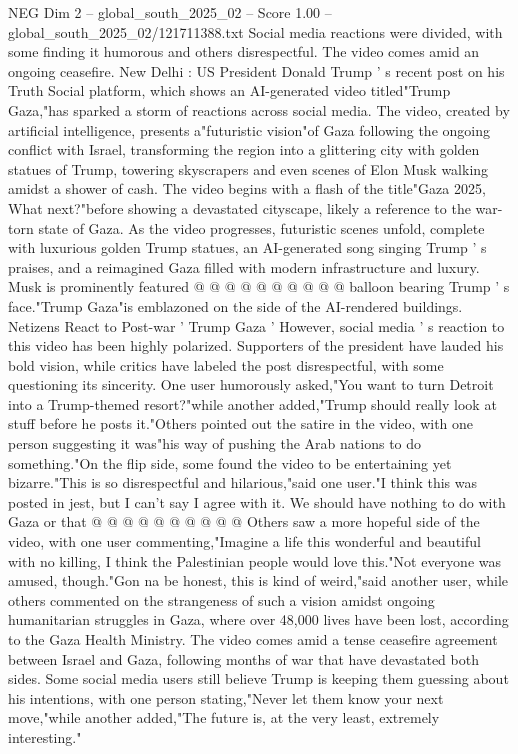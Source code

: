 \begin{textsample}{NEG Dim 2 – global\_south\_2025\_02 – Score 1.00 – global\_south\_2025\_02/121711388.txt}  \label{ex:f2_neg_070}
Social media reactions were divided, with some finding it humorous and others disrespectful.
The video comes amid an ongoing ceasefire.
New Delhi : US President Donald Trump ' s recent post on his Truth Social platform, which shows an AI-generated video titled"Trump Gaza,"has sparked a storm of reactions across social media.
The video, created by artificial intelligence, presents a"futuristic vision"of Gaza following the ongoing conflict with Israel, transforming the region into a glittering city with golden statues of Trump, towering skyscrapers and even scenes of Elon Musk walking amidst a shower of cash.
The video begins with a flash of the title"Gaza 2025, What next?"before showing a devastated cityscape, likely a reference to the war-torn state of Gaza.
As the video progresses, futuristic scenes unfold, complete with luxurious golden Trump statues, an AI-generated song singing Trump ' s praises, and a reimagined Gaza filled with modern infrastructure and luxury.
Musk is prominently featured @ @ @ @ @ @ @ @ @ @ balloon bearing Trump ' s face."Trump Gaza"is emblazoned on the side of the AI-rendered buildings.
Netizens React to Post-war ' Trump Gaza ' However, social media ' s reaction to this video has been highly polarized.
Supporters of the president have lauded his bold vision, while critics have labeled the post disrespectful, with some questioning its sincerity.
One user humorously asked,"You want to turn Detroit into a Trump-themed resort?"while another added,"Trump should really look at stuff before he posts it."Others pointed out the satire in the video, with one person suggesting it was"his way of pushing the Arab nations to do something."On the flip side, some found the video to be entertaining yet bizarre."This is so disrespectful and hilarious,"said one user."I think this was posted in jest, but I can't say I agree with it.
We should have nothing to do with Gaza or that @ @ @ @ @ @ @ @ @ @ Others saw a more hopeful side of the video, with one user commenting,"Imagine a life this wonderful and beautiful with no killing, I think the Palestinian people would love this."Not everyone was amused, though."Gon na be honest, this is kind of weird,"said another user, while others commented on the strangeness of such a vision amidst ongoing humanitarian struggles in Gaza, where over 48,000 lives have been lost, according to the Gaza Health Ministry.
The video comes amid a tense ceasefire agreement between Israel and Gaza, following months of war that have devastated both sides.
Some social media users still believe Trump is keeping them guessing about his intentions, with one person stating,"Never let them know your next move,"while another added,"The future is, at the very least, extremely interesting."

\end{textsample}
